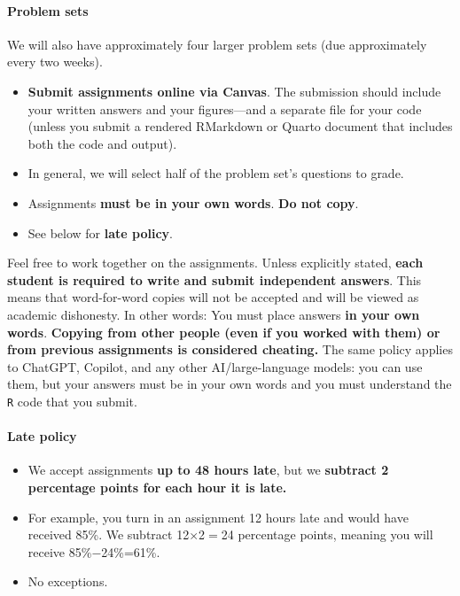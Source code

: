 \documentclass[10pt]{article}
\begin{document}
\paragraph{Problem sets} We will also have approximately four larger problem sets (due approximately every two weeks).
\begin{itemize}
  \item \textbf{Submit assignments online via Canvas}. The submission should include your written answers and your figures---and a separate file for your code (unless you submit a rendered RMarkdown or Quarto document that includes both the code and output).
  \item In general, we will select half of the problem set's questions to grade.
  \item Assignments \textbf{must be in your own words}. \textbf{Do not copy}.
  \item See below for \textbf{late policy}.
\end{itemize}
Feel free to work together on the assignments. Unless explicitly stated, \textbf{each student is required to write and submit independent answers}. This means that word-for-word copies will not be accepted and will be viewed as academic dishonesty. In other words: You must place answers \textbf{in your own words}. \textbf{Copying from other people (even if you worked with them) or from previous assignments is considered cheating.} The same policy applies to ChatGPT, Copilot, and any other AI/large-language models: you can use them, but your answers must be in your own words and you must understand the \texttt{R} code that you submit.

\paragraph{Late policy}
\begin{itemize}
  \item We accept assignments \textbf{up to 48 hours late}, but we \textbf{subtract 2 percentage points for each hour it is late.}
  \item For example, you turn in an assignment 12 hours late and would have received 85\%. We subtract 12$\times$2$=$24 percentage points, meaning you will receive 85\%$-$24\%=61\%.
  \item No exceptions.
\end{itemize}
\end{document}
